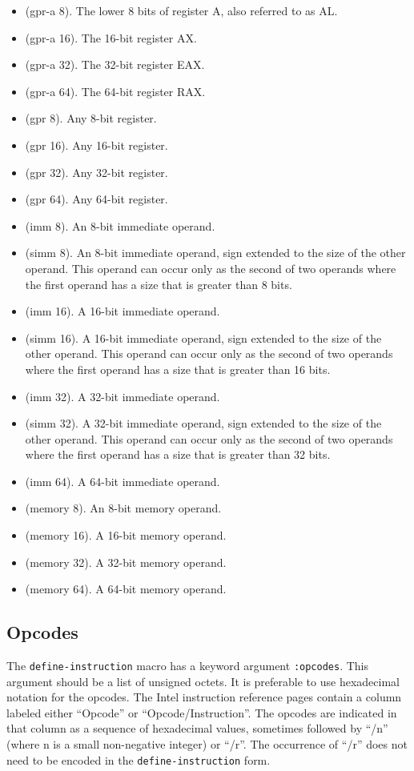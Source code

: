 \begin{itemize}
\item (gpr-a 8).  The lower 8 bits of register A, also referred to as AL.
\item (gpr-a 16).  The 16-bit register AX.
\item (gpr-a 32).  The 32-bit register EAX.
\item (gpr-a 64).  The 64-bit register RAX.
\item (gpr 8).  Any 8-bit register.
\item (gpr 16).  Any 16-bit register.
\item (gpr 32).  Any 32-bit register.
\item (gpr 64).  Any 64-bit register.
\item (imm 8).  An 8-bit immediate operand.
\item (simm 8).  An 8-bit immediate operand, sign extended to the size
  of the other operand.  This operand can occur only as the second of
  two operands where the first operand has a size that is greater than
  8 bits.
\item (imm 16).  A 16-bit immediate operand.
\item (simm 16).  A 16-bit immediate operand, sign extended to the size
  of the other operand.  This operand can occur only as the second of
  two operands where the first operand has a size that is greater than
  16 bits.
\item (imm 32).  A 32-bit immediate operand.
\item (simm 32).  A 32-bit immediate operand, sign extended to the size
  of the other operand.  This operand can occur only as the second of
  two operands where the first operand has a size that is greater than
  32 bits.
\item (imm 64).  A 64-bit immediate operand.
\item (memory 8).  An 8-bit memory operand.
\item (memory 16).  A 16-bit memory operand.
\item (memory 32).  A 32-bit memory operand.
\item (memory 64).  A 64-bit memory operand.
\end{itemize}

\subsection{Opcodes}

The \texttt{define-instruction} macro has a keyword argument
\texttt{:opcodes}.  This argument should be a list of unsigned octets.
It is preferable to use hexadecimal notation for the opcodes.  The
Intel instruction reference pages contain a column labeled either
``Opcode'' or ``Opcode/Instruction''.  The opcodes are indicated in
that column as a sequence of hexadecimal values, sometimes followed by
``/n'' (where n is a small non-negative integer) or ``/r''.  The
occurrence of ``/r'' does not need to be encoded in the
\texttt{define-instruction} form.

